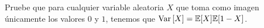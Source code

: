 \begin{statement}{16}
  Pruebe que para cualquier variable aleatoria $X$ que toma como imagen \'unicamente los valores
  $0$ y $1$, tenemos que ${\textrm{Var}}\,[X] = \mathbb{E}[X]\mathbb{E}[1 - X]$.
\end{statement}